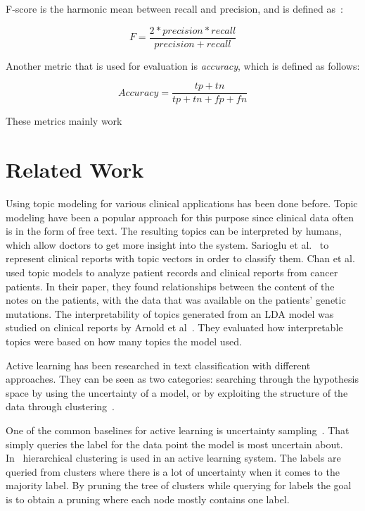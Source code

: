 F-score is the harmonic mean between recall and precision, and is defined as~\cite{tjong2003introduction}:

\begin{equation}
    F = \frac{2*precision*recall}{precision+recall}
\end{equation}

Another metric that is used for evaluation is \textit{accuracy}, which is defined as follows:

\begin{equation}
    Accuracy = \frac{tp+tn}{tp+tn+fp+fn}
\end{equation}

These metrics mainly work
\section{Related Work}

Using topic modeling for various clinical applications has been done before.
Topic modeling have been a popular approach for this purpose since clinical data often is in the form of free text.
The resulting topics can be interpreted by humans, which allow doctors to get more insight into the system.
Sarioglu et al\@.~\cite{sarioglu2013topic} to represent clinical reports with topic vectors in order to classify them.
Chan et al\@.~\cite{chan2013empirical} used topic models to analyze patient records and clinical reports from cancer patients.
In their paper, they found relationships between the content of the notes on the patients, with the data that was available on the patients' genetic mutations.
The interpretability of topics generated from an LDA model was studied on clinical reports by Arnold et al~\cite{arnold2016evaluating}.
They evaluated how interpretable topics were based on how many topics the model used.

Active learning has been researched in text classification with different approaches.
They can be seen as two categories: searching through the hypothesis space by using the uncertainty of a model, or by exploiting the structure of the data through clustering~\cite{dasgupta2008hierarchical}.

One of the common baselines for active learning is uncertainty sampling~\cite{lewis1994sequential}.
That simply queries the label for the data point the model is most uncertain about.
In~\cite{dasgupta2008hierarchical} hierarchical clustering is used in an active learning system.
The labels are queried from clusters where there is a lot of uncertainty when it comes to the majority label.
By pruning the tree of clusters while querying for labels the goal is to obtain a pruning where each node mostly contains one label.

